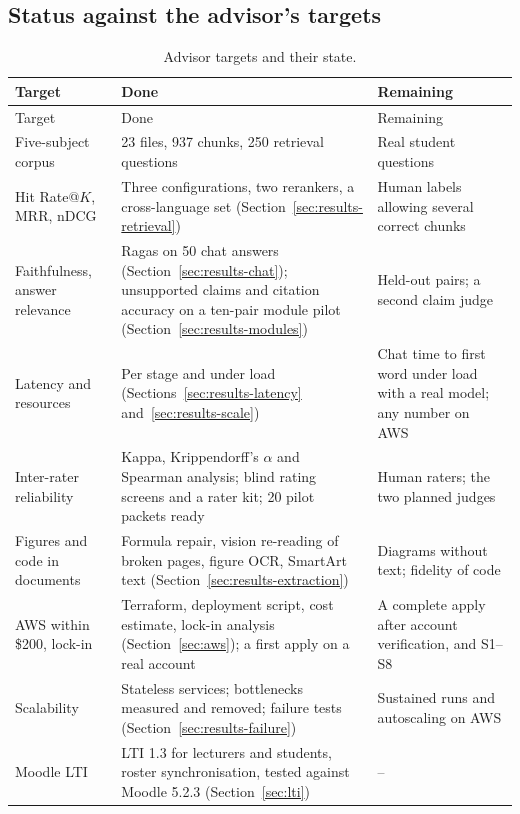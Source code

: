 \subsection{Status against the advisor's targets}
\begin{longtable}{|p{3.2cm}|p{6.2cm}|p{4.4cm}|}\caption{Advisor targets and their state.}\label{tab:feedback}\\\hline
Target & Done & Remaining\\\hline\endfirsthead
\hline Target & Done & Remaining\\\hline\endhead
Five-subject corpus & 23 files, 937 chunks, 250 retrieval questions & Real student questions\\\hline
Hit Rate@$K$, MRR, nDCG & Three configurations, two rerankers, a cross-language set (Section~\ref{sec:results-retrieval}) & Human labels allowing several correct chunks\\\hline
Faithfulness, answer relevance & Ragas on 50 chat answers (Section~\ref{sec:results-chat}); unsupported claims and citation accuracy on a ten-pair module pilot (Section~\ref{sec:results-modules}) & Held-out pairs; a second claim judge\\\hline
Latency and resources & Per stage and under load (Sections~\ref{sec:results-latency} and~\ref{sec:results-scale}) & Chat time to first word under load with a real model; any number on AWS\\\hline
Inter-rater reliability & Kappa, Krippendorff's $\alpha$ and Spearman analysis; blind rating screens and a rater kit; 20 pilot packets ready & Human raters; the two planned judges\\\hline
Figures and code in documents & Formula repair, vision re-reading of broken pages, figure OCR, SmartArt text (Section~\ref{sec:results-extraction}) & Diagrams without text; fidelity of code\\\hline
AWS within \$200, lock-in & Terraform, deployment script, cost estimate, lock-in analysis (Section~\ref{sec:aws}); a first apply on a real account & A complete apply after account verification, and S1--S8\\\hline
Scalability & Stateless services; bottlenecks measured and removed; failure tests (Section~\ref{sec:results-failure}) & Sustained runs and autoscaling on AWS\\\hline
Moodle LTI & LTI 1.3 for lecturers and students, roster synchronisation, tested against Moodle 5.2.3 (Section~\ref{sec:lti}) & --\\\hline
\end{longtable}

